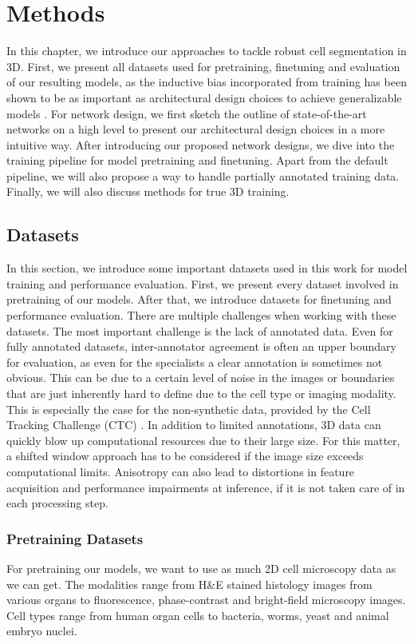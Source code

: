 \chapter{Methods}
\label{Methods}

In this chapter, we introduce our approaches to tackle robust cell segmentation in 3D. First, we present all datasets used for pretraining, finetuning and evaluation of our resulting models, as the inductive bias incorporated from training has been shown to be as important as architectural design choices to achieve generalizable models \cite{Pachitariu.2025}. For network design, we first sketch the outline of state-of-the-art networks on a high level to present our architectural design choices in a more intuitive way. After introducing our proposed network designs, we dive into the training pipeline for model pretraining and finetuning. Apart from the default pipeline, we will also propose a way to handle partially annotated training data. Finally, we will also discuss methods for true 3D training. 
\section{Datasets}


In this section, we introduce some important datasets used in this work for model training and performance evaluation. First, we present every dataset involved in pretraining of our models. After that, we introduce datasets for finetuning and performance evaluation.
There are multiple challenges when working with these datasets. The most important challenge is the lack of annotated data. Even for fully annotated datasets, inter-annotator agreement is often an upper boundary for evaluation, as even for the specialists a clear annotation is sometimes not obvious. This can be due to a certain level of noise in the images or boundaries that are just inherently hard to define due to the cell type or imaging modality. This is especially the case for the non-synthetic data, provided by the Cell Tracking Challenge (CTC) \cite{ctc}. In addition to limited annotations, 3D data can quickly blow up computational resources due to their large size. For this matter, a shifted window approach has to be considered if the image size exceeds computational limits. Anisotropy can also lead to distortions in feature acquisition and performance impairments at inference, if it is not taken care of in each processing step. 

\subsection{Pretraining Datasets}
\label{section_pretraining_datasets}
For pretraining our models, we want to use as much 2D cell microscopy data as we can get. The modalities range from H\&E stained histology images from various organs to fluorescence, phase-contrast and bright-field microscopy images. Cell types range from human organ cells to bacteria, worms, yeast and animal embryo nuclei.

